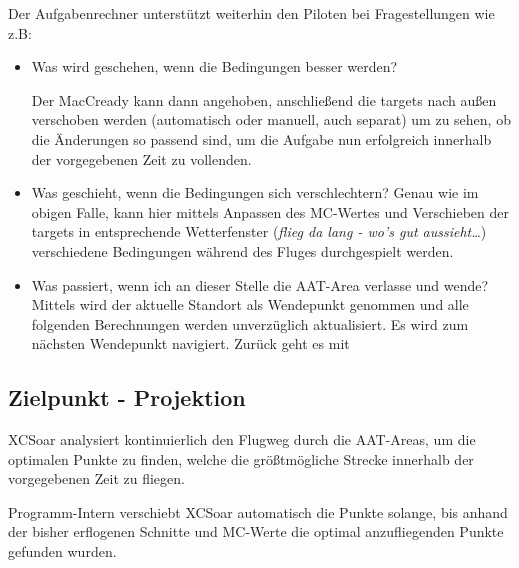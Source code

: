 Der Aufgabenrechner unterstützt weiterhin den Piloten bei Fragestellungen wie z.B:\
\begin{itemize}
\item Was wird geschehen, wenn die Bedingungen besser werden?

Der MacCready kann dann angehoben, anschließend die targets nach außen verschoben werden (automatisch oder manuell, auch separat) um zu sehen, ob die Änderungen so passend sind, um die Aufgabe nun erfolgreich innerhalb der vorgegebenen Zeit zu vollenden.
\item Was geschieht, wenn die Bedingungen sich verschlechtern? Genau wie im obigen Falle, kann hier mittels Anpassen des MC-Wertes und Verschieben der targets in entsprechende Wetterfenster (\textsl{flieg da lang - wo's gut aussieht\dots}) verschiedene Bedingungen während des Fluges durchgespielt werden.
\item Was passiert, wenn ich an dieser Stelle die AAT-Area verlasse und wende?
Mittels  \blink\smenut{Nächster}{Wendepunkt}  wird der aktuelle Standort als Wendepunkt genommen und alle folgenden Berechnungen werden  unverzüglich aktualisiert. Es wird zum nächsten Wendepunkt navigiert. Zurück geht es mit \button{NAV}\blink{}
\end{itemize}

\subsection*{Zielpunkt - Projektion}
\textsf{XCSoar} analysiert kontinuierlich den Flugweg durch die AAT-Areas, um  die optimalen Punkte zu finden, welche die größtmögliche Strecke innerhalb der vorgegebenen Zeit zu fliegen.

Programm-Intern verschiebt  \textsf{XCSoar} automatisch die Punkte solange, bis anhand der bisher erflogenen Schnitte und MC-Werte die optimal anzufliegenden Punkte gefunden wurden.

